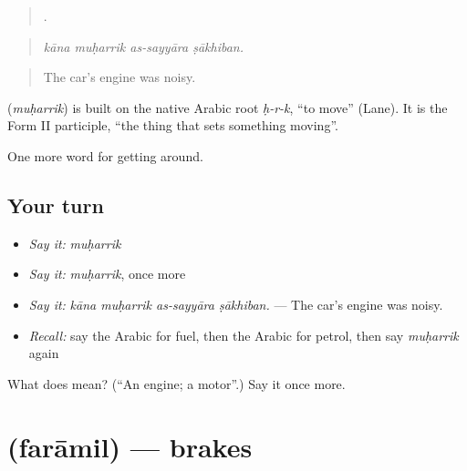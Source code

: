 \begin{quote}
   .
\end{quote}

\begin{quote}
\emph{kāna muḥarrik as-sayyāra ṣākhiban.}
\end{quote}

\begin{quote}
The car's engine was noisy.
\end{quote}

\begin{cousinweb}
\textbf{} (\emph{muḥarrik}) is built on the native Arabic root \emph{ḥ-r-k}, \textquotedblleft{}to move\textquotedblright{} (Lane). It is the Form II participle, \textquotedblleft{}the thing that sets something moving\textquotedblright{}.
\end{cousinweb}

\begin{grammarlens}[title={What you've built}]
One more word for getting around.
\end{grammarlens}

\subsection*{Your turn}
\begin{itemize}
\raggedright
  \item \emph{Say it:} \emph{muḥarrik}
  \item \emph{Say it:} \emph{muḥarrik}, once more
  \item \emph{Say it:} \emph{kāna muḥarrik as-sayyāra ṣākhiban.} — The car's engine was noisy.
  \item \emph{Recall:} say the Arabic for fuel, then the Arabic for petrol, then say \emph{muḥarrik} again
\end{itemize}

\begin{tcolorbox}[breakable,colback=teal!4,colframe=teal!35!black,title={Before you move on}]
What does  mean? (\textquotedblleft{}An engine; a motor\textquotedblright{}.) Say it once more.
\end{tcolorbox}
\section[\texorpdfstring{\ar{فرامل} (farāmil)}{فرامل (farāmil)}]{ (farāmil) — brakes}

\label{lesson:AR-C432-faramil}



